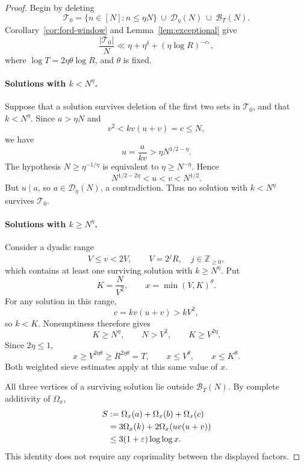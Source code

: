 \documentclass[11pt]{article}
\theoremstyle{definition}
\theoremstyle{remark}
\numberwithin{equation}{section}
\newcommand{\eps}{\varepsilon}
\begin{document}
\begin{proof}
Begin by deleting
\[
 \mathcal T_0=
 \{n\in[N]:n\le\eta N\}
 \ \cup\ \mathcal D_\eta(N)
 \ \cup\ \mathcal B_T(N).
\]
Corollary~\ref{cor:ford-window} and
Lemma~\ref{lem:exceptional} give
\begin{equation}\label{eq:initial-cost}
 \frac{|\mathcal T_0|}{N}
 \ll \eta+\eta^\delta+(\eta\log R)^{-c_*},
\end{equation}
where \(\log T=2\eta\theta\log R\), and \(\theta\) is fixed.

\paragraph{Solutions with \(k<N^\eta\).}
Suppose that a solution survives deletion of the first two sets
in \(\mathcal T_0\), and that \(k<N^\eta\).
Since \(a>\eta N\) and
\[
 v^2<kv(u+v)=c\le N,
\]
we have
\[
 u=\frac a{kv}>\eta N^{1/2-\eta}.
\]
The hypothesis \(N\ge\eta^{-1/\eta}\) is equivalent to
\(\eta\ge N^{-\eta}\). Hence
\[
 N^{1/2-2\eta}<u<v<N^{1/2}.
\]
But \(u\mid a\), so \(a\in\mathcal D_\eta(N)\), a contradiction.
Thus no solution with \(k<N^\eta\) survives \(\mathcal T_0\).

\paragraph{Solutions with \(k\ge N^\eta\).}
Consider a dyadic range
\[
 V\le v<2V,\qquad V=2^jR,\quad j\in\mathbb Z_{\ge0},
\]
which contains at least one surviving solution with
\(k\ge N^\eta\). Put
\begin{equation}\label{eq:scale}
 K=\frac N{V^2},\qquad x=\min(V,K)^\theta.
\end{equation}
For any solution in this range,
\[
 c=kv(u+v)>kV^2,
\]
so \(k<K\). Nonemptiness therefore gives
\[
 K\ge N^\eta,\qquad N>V^2,\qquad
 K\ge V^{2\eta}.
\]
Since \(2\eta\le1\),
\begin{equation}\label{eq:x-range}
 x\ge V^{2\eta\theta}\ge R^{2\eta\theta}=T,
 \qquad x\le V^\theta,\qquad x\le K^\theta.
\end{equation}
Both weighted sieve estimates apply at this same value of \(x\).

All three vertices of a surviving solution lie outside
\(\mathcal B_T(N)\). By complete additivity of \(\Omega_x\),
\begin{align}
 S&:=\Omega_x(a)+\Omega_x(b)+\Omega_x(c)\notag\\
  &=3\Omega_x(k)+2\Omega_x(uv(u+v))\notag\\
  &\le 3(1+\eps)\log\log x.
 \label{eq:normal-edge}
\end{align}
This identity does not require any coprimality between the
displayed factors.


\end{proof}
\end{document}
